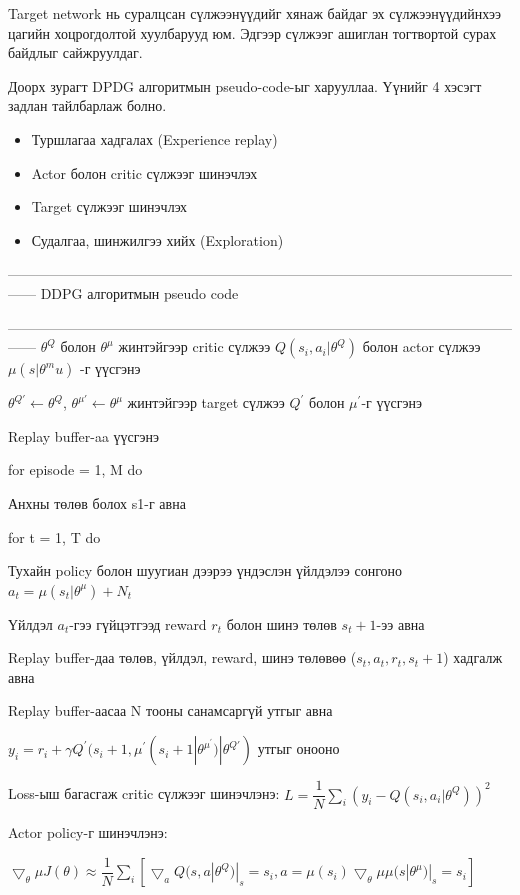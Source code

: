 \documentclass[12pt,A4]{report}
\begin{document}
Target network нь суралцсан сүлжээнүүдийг хянаж байдаг эх сүлжээнүүдийнхээ цагийн хоцрогдолтой хуулбарууд юм. Эдгээр сүлжээг ашиглан тогтвортой сурах байдлыг сайжруулдаг.	

Доорх зурагт DPDG алгоритмын pseudo-code-ыг харууллаа. Үүнийг 4 хэсэгт задлан тайлбарлаж болно.

\begin{itemize}
	\item Туршлагаа хадгалах (Experience replay)
	\item Actor болон critic сүлжээг шинэчлэх
	\item Target сүлжээг шинэчлэх
	\item Судалгаа, шинжилгээ хийх (Exploration)
\end{itemize} 

------------------------------------------------------------------------------------------------------------------
DDPG алгоритмын pseudo code

------------------------------------------------------------------------------------------------------------------
$\theta^Q$ болон $\theta^{\mu}$ жинтэйгээр critic сүлжээ $Q(s_i,a_i|\theta^Q)$ болон actor сүлжээ $\mu(s|\theta^mu)$ -г үүсгэнэ

$\theta^{Q{'}} \longleftarrow \theta^Q$, $\theta^{\mu{'}} \longleftarrow \theta^\mu$ жинтэйгээр target сүлжээ $Q^{'}$ болон $\mu^{'}$-г үүсгэнэ

Replay buffer-aa үүсгэнэ

for episode = 1, M do

\quad Анхны төлөв болох s1-г авна

\quad for t = 1, T do

\quad\quad Тухайн policy болон шуугиан дээрээ үндэслэн үйлдэлээ сонгоно $a_t = \mu(s_t|\theta^\mu)+N_t$

\quad\quad Үйлдэл $a_t$-гээ гүйцэтгээд reward $r_t$ болон шинэ төлөв $s_t+1$-ээ авна

\quad\quad Replay buffer-даа төлөв, үйлдэл, reward, шинэ төлөвөө ($s_t, a_t, r_t, s_t+1$) хадгалж авна

\quad\quad Replay buffer-аасаа N тооны санамсаргүй утгыг авна

\quad\quad $y_i=r_i+\gamma{Q^{'}}(s_i+1,\mu^{'}(s_i+1|\theta^{\mu^{'}})|\theta^{Q{'}})$ утгыг онооно

\quad\quad Loss-ыш багасгаж critic сүлжээг шинэчлэнэ: $L = \dfrac{1}{N}\sum_{i}(y_i-Q(s_i,a_i|\theta^Q))^2$

\quad\quad Actor policy-г шинэчлэнэ: 
\begin{center}
$\bigtriangledown_\theta\mu J(\theta) \approx \dfrac{1}{N}\sum_{i}[\bigtriangledown_a Q(s, a|\theta^Q)|_s=s_i,a=\mu(s_i)\bigtriangledown_\theta\mu \mu(s|\theta^\mu)|_s=s_i]$
\end{center}
\end{document}
